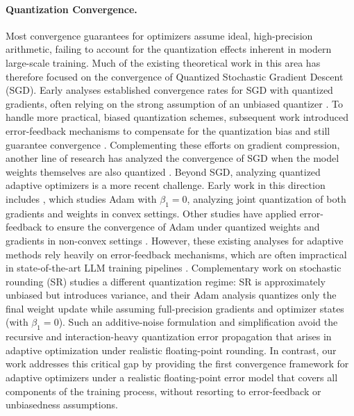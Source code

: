 \documentclass[11pt, letterpaper]{article}
\begin{document}
\paragraph{Quantization Convergence.}
Most convergence guarantees for optimizers assume ideal, high-precision arithmetic, failing to account for the quantization effects inherent in modern large-scale training. Much of the existing theoretical work in this area has therefore focused on the convergence of Quantized Stochastic Gradient Descent (SGD). Early analyses established convergence rates for SGD with quantized gradients, often relying on the strong assumption of an unbiased quantizer \citep{alistarh2017qsgd,jiang2018qsgd,wen2017terngrad}. To handle more practical, biased quantization schemes, subsequent work introduced error-feedback mechanisms to compensate for the quantization bias and still guarantee convergence \citep{karimireddy2019error,zheng2019communication,tang2019deepsqueeze,Koloskova2020Decentralized}. Complementing these efforts on gradient compression, another line of research has analyzed the convergence of SGD when the model weights themselves are also quantized \citep{markov2023quantized}. Beyond SGD, analyzing quantized adaptive optimizers is a more recent challenge. 
Early work in this direction includes \citet{hou2019analysis}, which studies Adam with $\beta_1 = 0$, analyzing joint quantization of both gradients and weights in convex settings. Other studies have applied error-feedback to ensure the convergence of Adam under quantized weights and gradients in non-convex settings \citep{chen2021quantized,modoranu2024microadam,robert2025ldadam}. However, these existing analyses for adaptive methods rely heavily on error-feedback mechanisms, which are often impractical in state-of-the-art LLM training pipelines \citep{xi2025coat,fishman2025scaling}. Complementary work on stochastic rounding (SR) \citep{ozkara2025stochastic} studies a different quantization regime: SR is approximately unbiased but introduces variance, and their Adam analysis quantizes only the final weight update while assuming full-precision gradients and optimizer states (with $\beta_1 = 0$). Such an additive-noise formulation and simplification avoid the recursive and interaction-heavy quantization error propagation that arises in adaptive optimization under realistic floating-point rounding. In contrast, our work addresses this critical gap by providing the first convergence framework for adaptive optimizers under a realistic floating-point error model that covers all components of the training process, without resorting to error-feedback or unbiasedness assumptions.
\end{document}
